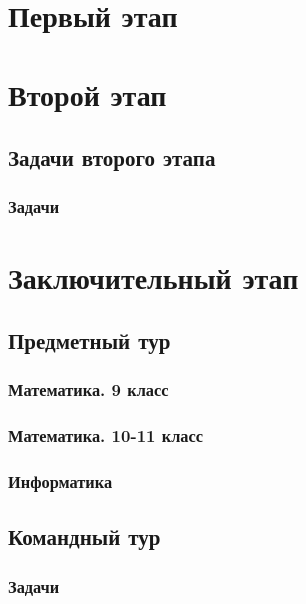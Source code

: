 \documentclass[a4paper,12pt,oneside]{book}
\begin{document}

\setcounter{tocdepth}{1}

\setcounter{page}{3}

\tableofcontents


 
\part{Первый этап}




\part{Второй этап}
\clearpage 
\chapter{Задачи второго этапа}
\section{Задачи}



\part{Заключительный этап}

\clearpage
\chapter{Предметный тур}

\section{Математика. 9 класс}


\section{Математика. 10-11 класс}


\section{Информатика}


\chapter{Командный тур}
\section{Задачи}



\clearpage
\text{ }
\end{document}
